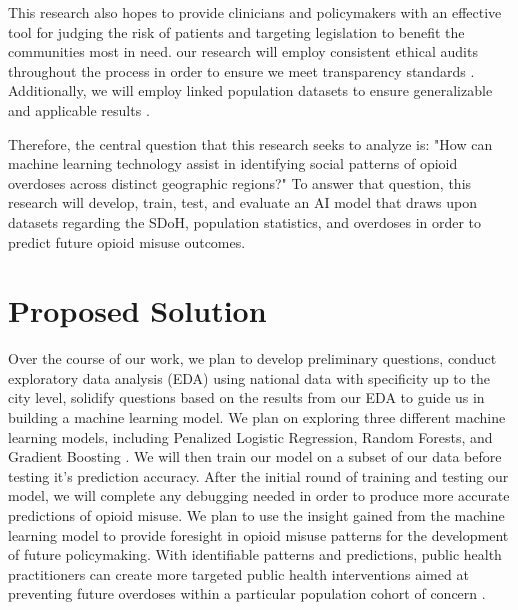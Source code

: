 \documentclass[journal]{IEEEtran}
\begin{document}
    This research also hopes to provide clinicians and policymakers with an effective tool for judging the risk of patients and targeting legislation to benefit the communities most in need. our research will employ consistent ethical audits throughout the process in order to ensure we meet transparency standards \cite{gabrielReviewLeveragingArtificial2025, bharatBigDataPredictive2021, centerfordevicesandradiologicalhealthTransparencyMachineLearningEnabled2024, ramirezmedinaSystematicReviewMachine2025}. Additionally, we will employ linked population datasets to ensure generalizable and applicable results \cite{allenOpportunitiesOpioidOverdose2022}.

    Therefore, the central question that this research seeks to analyze is: "How can machine learning technology assist in identifying social patterns of opioid overdoses across distinct geographic regions?" To answer that question, this research will develop, train, test, and evaluate an AI model that draws upon datasets regarding the SDoH, population statistics, and overdoses in order to predict future opioid misuse outcomes.


    \section{Proposed Solution}

    Over the course of our work, we plan to develop preliminary questions, conduct exploratory data analysis (EDA) using national data with specificity up to the city level, solidify questions based on the results from our EDA to guide us in building a machine learning model. We plan on exploring three different machine learning models, including Penalized Logistic Regression, Random Forests, and Gradient Boosting \cite{partonMachineLearningApproach2026}. We will then train our model on a subset of our data before testing it's prediction accuracy. After the initial round of training and testing our model, we will complete any debugging needed in order to produce more accurate predictions of opioid misuse. We plan to use the insight gained from the machine learning model to provide foresight in opioid misuse patterns for the development of future policymaking. With identifiable patterns and predictions, public health practitioners can create more targeted public health interventions aimed at preventing future overdoses within a particular population cohort of concern \cite{blancoDataNeedsModels2022}.
\end{document}
